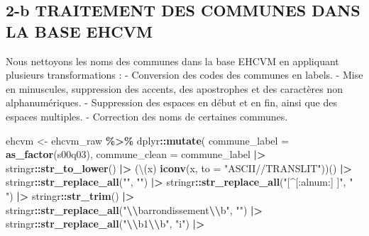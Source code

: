 \documentclass[
]{article}
\newenvironment{Shaded}{\begin{snugshade}}{\end{snugshade}}
\newcommand{\AttributeTok}[1]{\textcolor[rgb]{0.13,0.29,0.53}{#1}}
\newcommand{\FunctionTok}[1]{\textcolor[rgb]{0.13,0.29,0.53}{\textbf{#1}}}
\newcommand{\NormalTok}[1]{#1}
\newcommand{\OtherTok}[1]{\textcolor[rgb]{0.56,0.35,0.01}{#1}}
\newcommand{\SpecialCharTok}[1]{\textcolor[rgb]{0.81,0.36,0.00}{\textbf{#1}}}
\newcommand{\StringTok}[1]{\textcolor[rgb]{0.31,0.60,0.02}{#1}}
\begin{document}
\subsection{2-b TRAITEMENT DES COMMUNES DANS LA BASE
EHCVM}\label{b-traitement-des-communes-dans-la-base-ehcvm}

Nous nettoyons les noms des communes dans la base EHCVM en appliquant
plusieurs transformations : - Conversion des codes des communes en
labels. - Mise en minuscules, suppression des accents, des apostrophes
et des caractères non alphanumériques. - Suppression des espaces en
début et en fin, ainsi que des espaces multiples. - Correction des noms
de certaines communes.

\begin{Shaded}
\begin{Highlighting}[]
\NormalTok{ehcvm }\OtherTok{\textless{}{-}}\NormalTok{ ehcvm\_raw }\SpecialCharTok{\%\textgreater{}\%}
\NormalTok{  dplyr}\SpecialCharTok{::}\FunctionTok{mutate}\NormalTok{(}
    \AttributeTok{commune\_label =} \FunctionTok{as\_factor}\NormalTok{(s00q03),}
    \AttributeTok{commune\_clean =}\NormalTok{ commune\_label }\SpecialCharTok{|\textgreater{}}
\NormalTok{      stringr}\SpecialCharTok{::}\FunctionTok{str\_to\_lower}\NormalTok{() }\SpecialCharTok{|\textgreater{}}
\NormalTok{      (\textbackslash{}(x) }\FunctionTok{iconv}\NormalTok{(x, }\AttributeTok{to =} \StringTok{"ASCII//TRANSLIT"}\NormalTok{))() }\SpecialCharTok{|\textgreater{}}
\NormalTok{      stringr}\SpecialCharTok{::}\FunctionTok{str\_replace\_all}\NormalTok{(}\StringTok{"\textquotesingle{}"}\NormalTok{, }\StringTok{""}\NormalTok{) }\SpecialCharTok{|\textgreater{}}
\NormalTok{      stringr}\SpecialCharTok{::}\FunctionTok{str\_replace\_all}\NormalTok{(}\StringTok{"[\^{}[:alnum:] ]"}\NormalTok{, }\StringTok{" "}\NormalTok{) }\SpecialCharTok{|\textgreater{}}
\NormalTok{      stringr}\SpecialCharTok{::}\FunctionTok{str\_trim}\NormalTok{() }\SpecialCharTok{|\textgreater{}}
\NormalTok{      stringr}\SpecialCharTok{::}\FunctionTok{str\_replace\_all}\NormalTok{(}\StringTok{"}\SpecialCharTok{\textbackslash{}\textbackslash{}}\StringTok{barrondissement}\SpecialCharTok{\textbackslash{}\textbackslash{}}\StringTok{b"}\NormalTok{, }\StringTok{""}\NormalTok{) }\SpecialCharTok{|\textgreater{}}
\NormalTok{      stringr}\SpecialCharTok{::}\FunctionTok{str\_replace\_all}\NormalTok{(}\StringTok{"}\SpecialCharTok{\textbackslash{}\textbackslash{}}\StringTok{b1}\SpecialCharTok{\textbackslash{}\textbackslash{}}\StringTok{b"}\NormalTok{, }\StringTok{"i"}\NormalTok{) }\SpecialCharTok{|\textgreater{}}

\end{Highlighting}
\end{Shaded}
\end{document}
